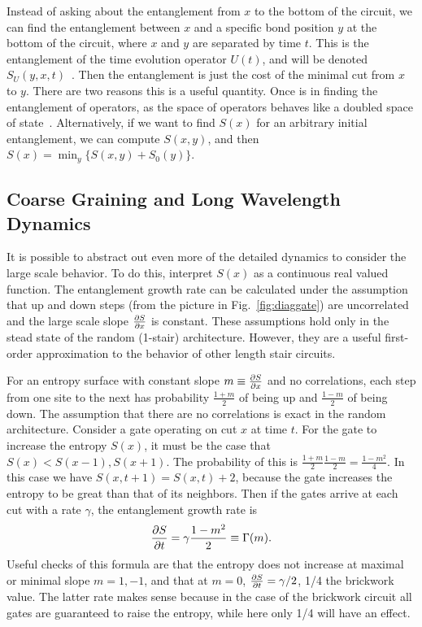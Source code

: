 Instead of asking about the entanglement from $x$ to the bottom of the circuit, we can find the entanglement between $x$ and a specific bond position $y$ at the bottom of the circuit, where $x$ and $y$ are separated by time $t$. This is the entanglement of the time evolution operator $U(t)$, and will be denoted $S_U(y,x,t)$~\cite{Jonay18}. Then the entanglement is just the cost of the minimal cut from $x$ to $y$. There are two reasons this is a useful quantity. Once is in finding the entanglement of operators, as the space of operators behaves like a doubled space of state~\cite{Jonay17, Jonay18}. Alternatively, if we want to find $S(x)$ for an arbitrary initial entanglement, we can compute $S(x,y)$, and then $S(x) = \min_y\{S(x,y) + S_0(y)\}$.

\subsection{Coarse Graining and Long Wavelength Dynamics} \label{sub:coarse}

It is possible to abstract out even more of the detailed dynamics to consider the large scale behavior. To do this, interpret $S(x)$ as a continuous real valued function. The entanglement growth rate can be calculated under the assumption that up and down steps (from the picture in Fig.~\ref{fig:diaggate}) are uncorrelated and the large scale slope $\frac{\partial S}{\partial x}$ is constant. These assumptions hold only in the stead state of the random (1-stair) architecture. However, they are a useful first-order approximation to the behavior of other length stair circuits.

For an entropy surface with constant slope $m\equiv\frac{\partial S}{\partial x}$ and no correlations, each step from one site to the next has probability $\frac{1+m}{2}$ of being up and $\frac{1-m}{2}$ of being down. The assumption that there are no correlations is exact in the random architecture. Consider a gate operating on cut $x$ at time $t$. For the gate to increase the entropy $S(x)$, it must be the case that $S(x)<S(x-1), S(x+1)$. The probability of this is $\frac{1+m}{2} \frac{1-m}{2} = \frac{1-m^2}{4}$. In this case we have $S(x,t+1)=S(x,t)+2$, because the gate increases the entropy to be great than that of its neighbors. Then if the gates arrive at each cut with a rate $\gamma$, the entanglement growth rate is
\begin{align}
\frac{\partial S}{\partial t} = \gamma\frac{1-m^2}{2}\equiv \Gamma(m). \label{eqn:randomgrowthrate}
\end{align}
Useful checks of this formula are that the entropy does not increase at maximal or minimal slope $m=1,-1$, and that at $m=0$, $\frac{\partial S}{\partial t}=\gamma/2$, 1/4 the brickwork value. The latter rate makes sense because in the case of the brickwork circuit all gates are guaranteed to raise the entropy, while here only 1/4 will have an effect.

